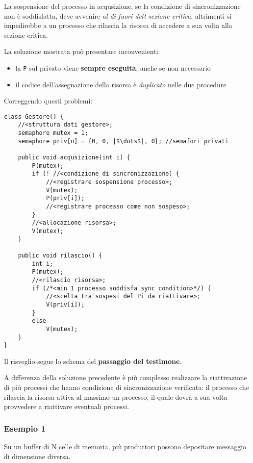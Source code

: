 La sospensione del processo in acqusizione, se la condizione di sincronizzazione non è soddisfatta, deve avvenire \textit{al di fuori dell sezione critica}, altrimenti si impedirebbe a un processo che rilascia la risorsa di accedere a sua volta alla sezione critica.

La soluzione mostrata può presentare inconvenienti:
\begin{itemize}
    \item la \texttt{P} sul privato viene \textbf{sempre eseguita}, anche se non necessario
    \item il codice dell'assegnazione della risorsa è \textit{duplicato} nelle due procedure
\end{itemize}

Correggendo questi problemi:

\begin{verbatim}
class Gestore() {
    //<struttura dati gestore>;
    semaphore mutex = 1;
    semaphore priv[n] = {0, 0, |$\dots$|, 0}; //semafori privati

    public void acqusizione(int i) {
        P(mutex);
        if (! //<condizione di sincronizzazione) {
            //<registrare sospensione processo>;
            V(mutex);
            P(priv[i]);
            //<registrare processo come non sospeso>;
        }
        //<allocazione risorsa>;
        V(mutex);
    }

    public void rilascio() {
        int i;
        P(mutex);
        //<rilascio risorsa>;
        if (/*<min 1 processo soddisfa sync condition>*/) {
            //<scelta tra sospesi del Pi da riattivare>;
            V(priv[i]);
        }
        else
            V(mutex);
    }
}
\end{verbatim}

Il risveglio segue lo schema del \textbf{passaggio del testimone}.

A differenza della soluzione precedente è più complesso realizzare la riattivazione di più processi che hanno condizione di sincronizzazione verificata: il processo che rilascia la risorsa attiva al massimo un processo, il quale dovrà a sua volta provvedere a riattivare eventuali processi.

\subsubsection{Esempio 1}
Su un buffer di N celle di memoria, più produttori possono depositare messaggio di dimensione diversa.

